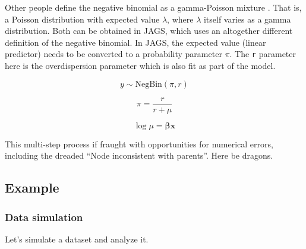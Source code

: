 \documentclass[
  13,
  letterpaper,
]{report}
\begin{document}
Other people define the negative binomial as a gamma-Poisson mixture .
That is, a Poisson distribution with expected value \(\lambda\), where
\(\lambda\) itself varies as a gamma distribution. Both can be obtained
in JAGS, which uses an altogether different definition of the negative
binomial. In JAGS, the expected value (linear predictor) needs to be
converted to a probability parameter \(\pi\). The \texttt{r} parameter
here is the overdispersion parameter which is also fit as part of the
model.

\[y\sim \text{NegBin}\left(\pi,r\right)\]

\[\pi=\frac{r}{r+\mu}\]

\[\log{\mu}=\boldsymbol{\beta}\mathbf{x}\]

This multi-step process if fraught with opportunities for numerical
errors, including the dreaded ``Node inconsistent with parents''. Here
be dragons.

\subsection{Example}\label{sec-glm1-nb-ex}

\subsubsection{Data simulation}\label{sec-glm1-nb-ex-sim}

Let's simulate a dataset and analyze it.
\end{document}
